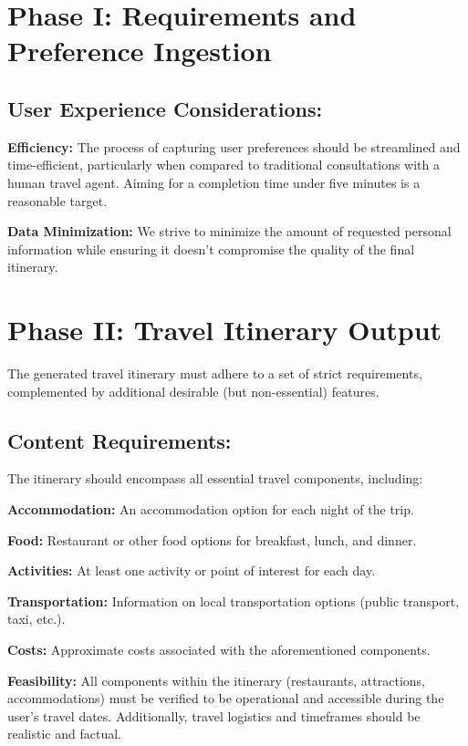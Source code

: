 \documentclass[12pt,a4paper]{report}
\begin{document}
\section{Phase I: Requirements and Preference Ingestion}

\subsection{User Experience Considerations:}

\begin{description}
\item{\textbf{Efficiency:} The process of capturing user preferences should be streamlined and time-efficient, particularly when compared to traditional consultations with a human travel agent. Aiming for a completion time under five minutes is a reasonable target.}
\item{\textbf{Data Minimization:} We strive to minimize the amount of requested personal information while ensuring it doesn't compromise the quality of the final itinerary.}
\end{description}

\section{Phase II: Travel Itinerary Output}

The generated travel itinerary must adhere to a set of strict requirements, complemented by additional desirable (but non-essential) features.

\subsection{Content Requirements:}

The itinerary should encompass all essential travel components, including:
\begin{description}
\item{\textbf{Accommodation:} An accommodation option for each night of the trip.}
\item{\textbf{Food:} Restaurant or other food options for breakfast, lunch, and dinner.}
\item{\textbf{Activities:} At least one activity or point of interest for each day.}
\item{\textbf{Transportation:} Information on local transportation options (public transport, taxi, etc.).}
\item{\textbf{Costs:} Approximate costs associated with the aforementioned components.}
\item{\textbf{Feasibility:} All components within the itinerary (restaurants, attractions, accommodations) must be verified to be operational and accessible during the user's travel dates. Additionally, travel logistics and timeframes should be realistic and factual.}
\end{description}
\end{document}
